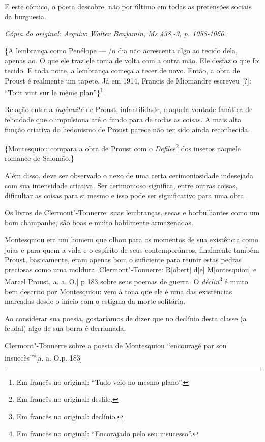 E este cômico, o poeta descobre, não por último em todas as pretensões
sociais da burguesia.

\begin{flushright}
\emph{\small{Cópia do original: Arquivo Walter Benjamin, Ms 438,-3, p. 1058-1060.}}
\end{flushright}

\{A lembrança como Penélope --- /o dia não acrescenta algo ao tecido dela,
apenas ao. O que ele traz ele toma de volta com a outra mão. Ele desfaz
o que foi tecido. E toda noite, a lembrança começa a tecer de novo.
Então, a obra de Proust é realmente um tapete. Já em 1914, Francis de
Miomandre escreveu {[}?{]}: ``Tout vint sur le même plan''\}\footnote{Em francês no original: ``Tudo veio no mesmo plano''. \versal{[N. T.]}}

Relação entre a \emph{ingénuité} de Proust, infantilidade, e aquela
vontade fanática de felicidade que o impulsiona até o fundo para de
todas as coisas. A mais alta função criativa do hedonismo de Proust
parece não ter sido ainda reconhecida.

\{Montesquiou compara a obra de Proust com o \emph{Defilee}\footnote{Em francês no original: desfile. \versal{[N. T.]}} dos insetos naquele romance de
Salomão.\}

Além disso, deve ser observado o nexo de uma certa cerimoniosidade
indesejada com sua intensidade criativa. Ser cerimonioso significa,
entre outras coisas, dificultar as coisas para si mesmo e isso pode ser
significativo para uma obra.

Os livros de Clermont"-Tonnerre: suas lembranças, secas e borbulhantes
como um bom champanhe, são boas e muito habilmente armazenadas.

Montesquiou era um homem que olhou para os momentos de sua existência
como joias e para quem a vida e o espírito de seus contemporâneos,
finalmente também Proust, basicamente, eram apenas bom o suficiente para
reunir estas pedras preciosas como uma moldura. Clermont"-Tonnerre: R{[}obert{]} d{[}e{]} M{[}ontesquiou{]} e Marcel Proust, a. a. O.{]} p
183 sobre seus poemas de guerra. O \emph{déclin}\footnote{Em francês no original: declínio. \versal{[N. T.]}} é muito bem descrito por
Montesquiou: vem à tona que ele é uma das existências marcadas desde o
início com o estigma da morte solitária.

Ao considerar sua poesia, gostaríamos de dizer que no declínio desta
classe (a feudal) algo de sua borra é derramada.

Clermont"-Tonnerre sobre a poesia de Montesquiou ``encouragé par son
insuccès''\footnote{Em francês no original: ``Encorajado pelo seu insucesso''. \versal{[N. T.]}}{[}a. a. O.p. 183{]}

